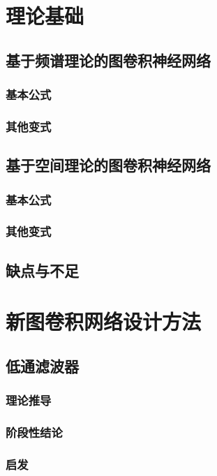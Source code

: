 \cleardoublepage

\section{理论基础}

\subsection{基于频谱理论的图卷积神经网络}
\subsubsection{基本公式}
\subsubsection{其他变式}

\subsection{基于空间理论的图卷积神经网络}
\subsubsection{基本公式}
\subsubsection{其他变式}

\subsection{缺点与不足}


\section{新图卷积网络设计方法}

\subsection{低通滤波器}
\subsubsection{理论推导}
\subsubsection{阶段性结论}
\subsubsection{启发}

